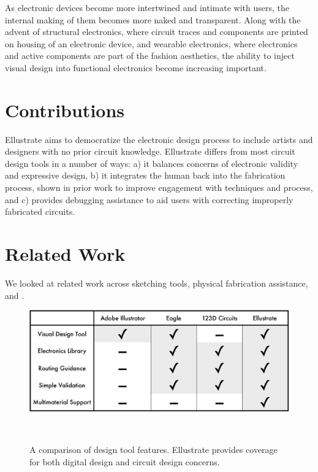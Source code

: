 \documentclass{sigchi}
\begin{document}

As electronic devices become more intertwined and intimate with users, the internal making of them becomes more naked and transparent. Along with the advent of structural electronics, where circuit traces and components are printed on housing of an electronic device, and wearable electronics, where electronics and active components are part of the fashion aesthetics, the ability to inject visual design into functional electronics become increasing important.

\section{Contributions}
Ellustrate aims to democratize the electronic design process to include artists and designers with no prior circuit knowledge. 
Ellustrate differs from most circuit design tools in a number of ways: a) it balances concerns of electronic validity and expressive design, b) it integrates the human back into the fabrication process, shown in prior work to improve engagement with techniques and process, and c) provides debugging assistance to aid users with correcting improperly fabricated circuits.


\section{Related Work}
We looked at related work across sketching tools, physical fabrication assistance, and .

\begin{figure}[t]
\centering
  \includegraphics[width=1\columnwidth]{figures/comparative_table.pdf}
  \caption{A comparison of design tool features. Ellustrate provides coverage for both digital design and circuit design concerns. }~\label{fig:comparison_table}
  \vspace{-16pt}
\end{figure}
\end{document}

